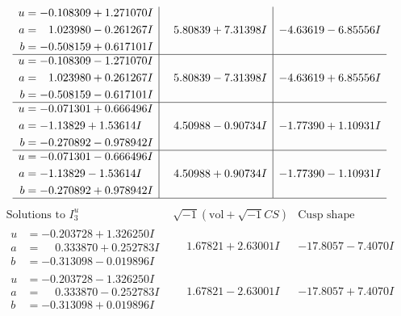 \documentclass[1p]{elsarticle_modified}
\theoremstyle{definition}
\newcommand{\I}{\sqrt{-1}}
\begin{document}
$$\begin{array}{c|c|c}
\begin{aligned}
u &= -0.108309 + 1.271070 I \\
a &= \phantom{-}1.023980 - 0.261267 I \\
b &= -0.508159 + 0.617101 I\end{aligned}
 & \phantom{-}5.80839 + 7.31398 I & -4.63619 - 6.85556 I \\ \hline\begin{aligned}
u &= -0.108309 - 1.271070 I \\
a &= \phantom{-}1.023980 + 0.261267 I \\
b &= -0.508159 - 0.617101 I\end{aligned}
 & \phantom{-}5.80839 - 7.31398 I & -4.63619 + 6.85556 I \\ \hline\begin{aligned}
u &= -0.071301 + 0.666496 I \\
a &= -1.13829 + 1.53614 I \\
b &= -0.270892 - 0.978942 I\end{aligned}
 & \phantom{-}4.50988 - 0.90734 I & -1.77390 + 1.10931 I \\ \hline\begin{aligned}
u &= -0.071301 - 0.666496 I \\
a &= -1.13829 - 1.53614 I \\
b &= -0.270892 + 0.978942 I\end{aligned}
 & \phantom{-}4.50988 + 0.90734 I & -1.77390 - 1.10931 I\\
 \hline 
 \end{array}$$\newpage$$\begin{array}{c|c|c}  
\text{Solutions to }I^u_{3}& \I (\text{vol} + \sqrt{-1}CS) & \text{Cusp shape}\\
 \hline 
\begin{aligned}
u &= -0.203728 + 1.326250 I \\
a &= \phantom{-}0.333870 + 0.252783 I \\
b &= -0.313098 - 0.019896 I\end{aligned}
 & \phantom{-}1.67821 + 2.63001 I & -17.8057 - 7.4070 I \\ \hline\begin{aligned}
u &= -0.203728 - 1.326250 I \\
a &= \phantom{-}0.333870 - 0.252783 I \\
b &= -0.313098 + 0.019896 I\end{aligned}
 & \phantom{-}1.67821 - 2.63001 I & -17.8057 + 7.4070 I \\ \hline\begin{aligned}

\end{aligned}
\end{array}$$
\end{document}
